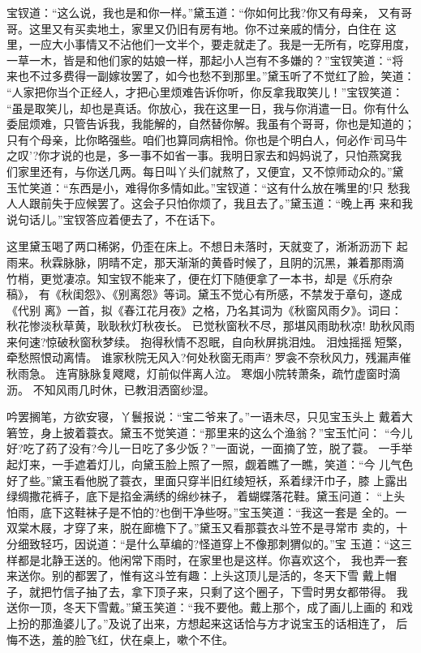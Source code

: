 宝钗道：“这么说，我也是和你一样。”黛玉道：“你如何比我?你又有母亲，
又有哥哥。这里又有买卖地土，家里又仍旧有房有地。你不过亲戚的情分，白住在
这里，一应大小事情又不沾他们一文半个，要走就走了。我是一无所有，吃穿用度，
一草一木，皆是和他们家的姑娘一样，那起小人岂有不多嫌的？”宝钗笑道：“将
来也不过多费得一副嫁妆罢了，如今也愁不到那里。”黛玉听了不觉红了脸，笑道：
“人家把你当个正经人，才把心里烦难告诉你听，你反拿我取笑儿！”宝钗笑道：
“虽是取笑儿，却也是真话。你放心，我在这里一日，我与你消遣一日。你有什么
委屈烦难，只管告诉我，我能解的，自然替你解。我虽有个哥哥，你也是知道的；
只有个母亲，比你略强些。咱们也算同病相怜。你也是个明白人，何必作‘司马牛
之叹’?你才说的也是，多一事不如省一事。我明日家去和妈妈说了，只怕燕窝我
们家里还有，与你送几两。每日叫丫头们就熬了，又便宜，又不惊师动众的。”黛
玉忙笑道：“东西是小，难得你多情如此。”宝钗道：“这有什么放在嘴里的!只
愁我人人跟前失于应候罢了。这会子只怕你烦了，我且去了。”黛玉道：“晚上再
来和我说句话儿。”宝钗答应着便去了，不在话下。

这里黛玉喝了两口稀粥，仍歪在床上。不想日未落时，天就变了，淅淅沥沥下
起雨来。秋霖脉脉，阴晴不定，那天渐渐的黄昏时候了，且阴的沉黑，兼着那雨滴
竹梢，更觉凄凉。知宝钗不能来了，便在灯下随便拿了一本书，却是《乐府杂稿》，
有《秋闺怨》、《别离怨》等词。黛玉不觉心有所感，不禁发于章句，遂成《代别
离》一首，拟《春江花月夜》之格，乃名其词为《秋窗风雨夕》。词曰：
秋花惨淡秋草黄，耿耿秋灯秋夜长。
已觉秋窗秋不尽，那堪风雨助秋凉!
助秋风雨来何速?惊破秋窗秋梦续。
抱得秋情不忍眠，自向秋屏挑泪烛。
泪烛摇摇短檠，牵愁照恨动离情。
谁家秋院无风入?何处秋窗无雨声?
罗衾不奈秋风力，残漏声催秋雨急。
连宵脉脉复飕飕，灯前似伴离人泣。
寒烟小院转萧条，疏竹虚窗时滴沥。
不知风雨几时休，已教泪洒窗纱湿。

吟罢搁笔，方欲安寝，丫鬟报说：“宝二爷来了。”一语未尽，只见宝玉头上
戴着大箬笠，身上披着蓑衣。黛玉不觉笑道：“那里来的这么个渔翁？”宝玉忙问：
“今儿好?吃了药了没有?今儿一日吃了多少饭？”一面说，一面摘了笠，脱了蓑。
一手举起灯来，一手遮着灯儿，向黛玉脸上照了一照，觑着瞧了一瞧，笑道：“今
儿气色好了些。”黛玉看他脱了蓑衣，里面只穿半旧红绫短袄，系着绿汗巾子，膝
上露出绿绸撒花裤子，底下是掐金满绣的绵纱袜子，着蝴蝶落花鞋。黛玉问道：
“上头怕雨，底下这鞋袜子是不怕的?也倒干净些呀。”宝玉笑道：“我这一套是
全的。一双棠木屐，才穿了来，脱在廊檐下了。”黛玉又看那蓑衣斗笠不是寻常市
卖的，十分细致轻巧，因说道：“是什么草编的?怪道穿上不像那刺猬似的。”宝
玉道：“这三样都是北静王送的。他闲常下雨时，在家里也是这样。你喜欢这个，
我也弄一套来送你。别的都罢了，惟有这斗笠有趣：上头这顶儿是活的，冬天下雪
戴上帽子，就把竹信子抽了去，拿下顶子来，只剩了这个圈子，下雪时男女都带得。
我送你一顶，冬天下雪戴。”黛玉笑道：“我不要他。戴上那个，成了画儿上画的
和戏上扮的那渔婆儿了。”及说了出来，方想起来这话恰与方才说宝玉的话相连了，
后悔不迭，羞的脸飞红，伏在桌上，嗽个不住。

